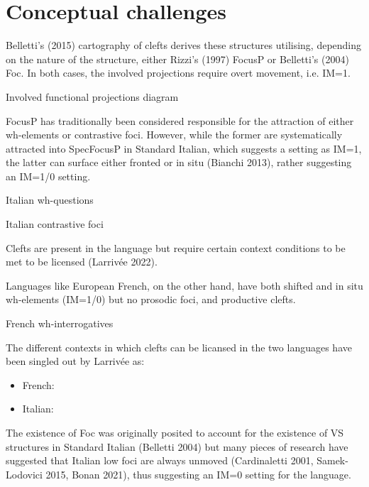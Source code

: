 \documentclass[fleqn,10pt]{wlscirep}
\begin{document}
\section*{Conceptual challenges}

Belletti’s (2015) cartography of clefts derives these structures utilising, depending on the nature of the structure, either Rizzi’s (1997) FocusP or Belletti’s (2004) Foc. 
In both cases, the involved projections require overt movement, i.e. IM=1.

\begin{exe}
    \ex Involved functional projections diagram
\end{exe}

FocusP has traditionally been considered responsible for the attraction of either wh-elements or contrastive foci. 
However, while the former are systematically attracted into SpecFocusP in Standard Italian, which suggests a setting as IM=1, the latter can surface either fronted or in situ (Bianchi 2013), rather suggesting an IM=1/0 setting. 

\begin{exe}
    \ex Italian wh-questions
\end{exe}

\begin{exe}
    \ex Italian contrastive foci
\end{exe}

Clefts are present in the language but require certain context conditions to be met to be licensed (Larrivée 2022). 

Languages like European French, on the other hand, have both shifted and in situ wh-elements (IM=1/0) but no prosodic foci, and productive clefts. 

\begin{exe}
    \ex French wh-interrogatives
\end{exe}

The different contexts in which clefts can be licansed in the two languages have been singled out by Larrivée as:
\begin{itemize}
    \item French:
    \item \vspace*{-2mm} Italian:
\end{itemize}

The existence of Foc was originally posited to account for the existence of VS structures in Standard Italian (Belletti 2004) but many pieces of research have suggested that Italian low foci are always unmoved (Cardinaletti 2001, Samek-Lodovici 2015, Bonan 2021), thus suggesting an IM=0 setting for the language. 
\end{document}
